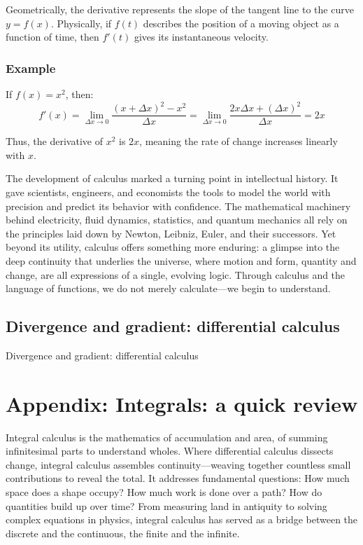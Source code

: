 \documentclass{book}
\begin{document}
Geometrically, the derivative represents the slope of the tangent line to the curve \( y = f(x) \). Physically, if \( f(t) \) describes the position of a moving object as a function of time, then \( f'(t) \) gives its instantaneous velocity.

\subsection*{Example}

If \( f(x) = x^2 \), then:
\[
f'(x) = \lim_{\Delta x \to 0} \frac{(x + \Delta x)^2 - x^2}{\Delta x}
= \lim_{\Delta x \to 0} \frac{2x\Delta x + (\Delta x)^2}{\Delta x}
= 2x
\]

Thus, the derivative of \( x^2 \) is \( 2x \), meaning the rate of change increases linearly with \( x \).

The development of calculus marked a turning point in intellectual history. It gave scientists, engineers, and economists the tools to model the world with precision and predict its behavior with confidence. The mathematical machinery behind electricity, fluid dynamics, statistics, and quantum mechanics all rely on the principles laid down by Newton, Leibniz, Euler, and their successors. Yet beyond its utility, calculus offers something more enduring: a glimpse into the deep continuity that underlies the universe, where motion and form, quantity and change, are all expressions of a single, evolving logic. Through calculus and the language of functions, we do not merely calculate---we begin to understand.\\

\section{Divergence and gradient: differential calculus}

Divergence and gradient: differential calculus



\chapter{Appendix: Integrals: a quick review}

Integral calculus is the mathematics of accumulation and area, of summing infinitesimal parts to understand wholes. Where differential calculus dissects change, integral calculus assembles continuity---weaving together countless small contributions to reveal the total. It addresses fundamental questions: How much space does a shape occupy? How much work is done over a path? How do quantities build up over time? From measuring land in antiquity to solving complex equations in physics, integral calculus has served as a bridge between the discrete and the continuous, the finite and the infinite.\\
\end{document}
